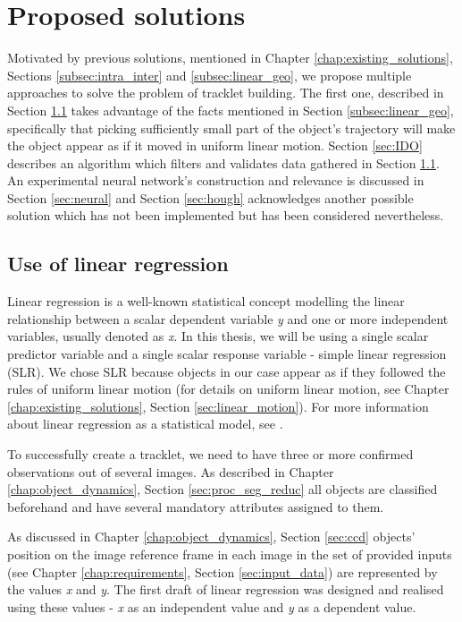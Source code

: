 \chapter{Proposed solutions}\label{chap:proposed_solutions}

	Motivated by previous solutions, mentioned in Chapter \ref{chap:existing_solutions}, Sections \ref{subsec:intra_inter} and \ref{subsec:linear_geo}, we propose multiple approaches to solve the problem of tracklet building. The first one, described in Section \ref{sec:linear_regression} takes advantage of the facts mentioned in Section \ref{subsec:linear_geo}, specifically that picking sufficiently small part of the object's trajectory will make the object appear as if it moved in uniform linear motion. Section \ref{sec:IDO} describes an algorithm which filters and validates data gathered in Section \ref{sec:linear_regression}. An experimental neural network's construction and relevance is discussed in Section \ref{sec:neural} and Section \ref{sec:hough} acknowledges another possible solution which has not been implemented but has been considered nevertheless.

\section{Use of linear regression}\label{sec:linear_regression}

	Linear regression is a well-known statistical concept modelling the linear relationship between a scalar dependent variable \emph{y} and one or more independent variables, usually denoted as \emph{x}. In this thesis, we will be using a single scalar predictor variable and a single scalar response variable - simple linear regression (SLR). We chose SLR because objects in our case appear as if they followed the rules of uniform linear motion (for details on uniform linear motion, see Chapter \ref{chap:existing_solutions}, Section \ref{sec:linear_motion}). For more information about linear regression as a statistical model, see \citep{freedman2005statistical}.
	
	To successfully create a tracklet, we need to have three or more confirmed observations out of several images. As described in Chapter \ref{chap:object_dynamics}, Section \ref{sec:proc_seg_reduc} all objects are classified beforehand and have several mandatory attributes assigned to them.
	
	As discussed in Chapter \ref{chap:object_dynamics}, Section \ref{sec:ccd} objects' position on the image reference frame in each image in the set of provided inputs (see Chapter \ref{chap:requirements}, Section \ref{sec:input_data}) are represented by the values \emph{x} and \emph{y}. The first draft of linear regression was designed and realised using these values - \emph{x} as an independent value and \emph{y} as a dependent value.
	
